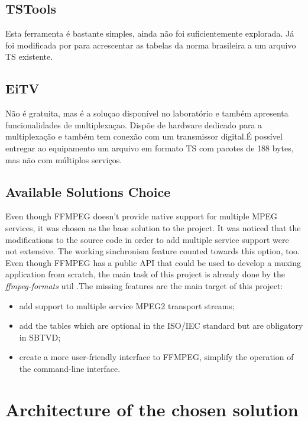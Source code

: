 \documentclass[
	12pt,				%
	openright,			%
	twoside,			%
	a4paper,			%
	brazil,
	french,				%
	english
	]{abntex2}
\begin{document}
\section{TSTools}

Esta ferramenta é bastante simples, ainda não foi suficientemente explorada. Já foi modificada por \cite{Borin} para acrescentar as tabelas da norma brasileira a um arquivo TS existente.

\section{EiTV}

Não é gratuita, mas é a soluçao disponível no laboratório e também apresenta funcionalidades de multiplexaçao. Dispõe de hardware dedicado para a multiplexação e também tem conexão com um transmissor digital.É possível entregar ao equipamento um arquivo em formato TS com pacotes de 188 bytes, mas não com múltiplos serviços.

\section{Available Solutions Choice}

Even though FFMPEG doesn't provide native support for multiple MPEG services, it was chosen as the base solution to the project. It was noticed that the modifications to the source code in order to add multiple service support were not extensive. The working sinchronism feature counted towards this option, too. Even though FFMPEG has a public API that could be used to develop a muxing application from scratch, the main task of this project is already done by the \textit{ffmpeg-formats} util .The missing features are the main target of this project:

\begin{itemize}

\item{add support to multiple service MPEG2 transport streams;}

\item{add the tables which are optional in the ISO/IEC standard but are obligatory in SBTVD;}

\item{create a more user-friendly interface to FFMPEG, simplify the operation of the command-line interface.}

\end{itemize}

\chapter{Architecture of the chosen solution}
\end{document}
